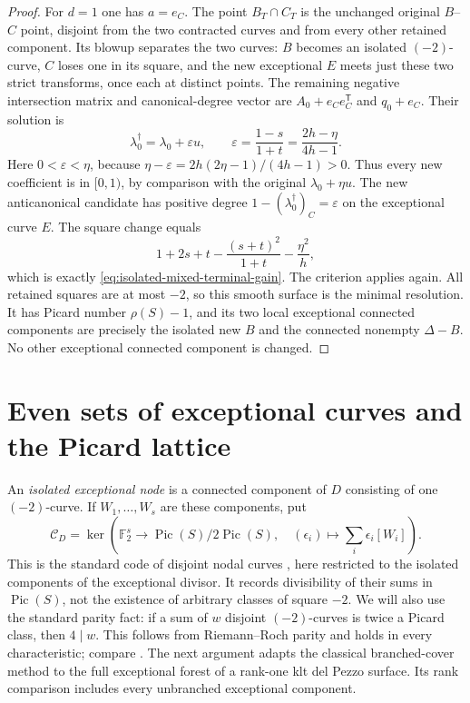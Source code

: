 \documentclass[11pt,reqno]{amsart}
\theoremstyle{definition}
\theoremstyle{remark}
\DeclareMathOperator{\Pic}{Pic}
\numberwithin{equation}{section}
\begin{document}
\begin{proof}
For $d=1$ one has $a=e_C$. The point $B_T\cap C_T$ is the unchanged
original $B$--$C$ point, disjoint from the two contracted curves and
from every other retained component. Its blowup separates the two
curves: $B$ becomes an isolated $(-2)$-curve, $C$ loses one in its
square, and the new exceptional $E$ meets just these two strict
transforms, once each at distinct points.
The remaining negative intersection matrix and canonical-degree vector are $A_0+e_Ce_C^{\mathsf T}$ and
$q_0+e_C$. Their solution is
\begin{equation}\label{eq:isolated-mixed-new-discrepancy}
 \lambda_0^\dagger=\lambda_0+\varepsilon u,\qquad
 \varepsilon=\frac{1-s}{1+t}=\frac{2h-\eta}{4h-1}.
\end{equation}
Here $0<\varepsilon<\eta$, because
$\eta-\varepsilon=2h(2\eta-1)/(4h-1)>0$.
Thus every new coefficient is in $[0,1)$, by comparison with the
original $\lambda_0+\eta u$.
The new anticanonical candidate has positive degree
$1-(\lambda_0^\dagger)_C=\varepsilon$ on the exceptional curve $E$.
The square change equals
\[
 1+2s+t-\frac{(s+t)^2}{1+t}-\frac{\eta^2}{h},
\]
which is exactly \eqref{eq:isolated-mixed-terminal-gain}.
The criterion applies again. All retained squares are at most $-2$,
so this smooth surface is the minimal resolution. It has Picard
number $\rho(S)-1$, and its two local exceptional connected components are precisely the
isolated new $B$ and the connected nonempty $\Delta-B$.
No other exceptional connected component is changed.
\end{proof}


\section{Even sets of exceptional curves and the Picard lattice}
\label{sec:nodes}
An \emph{isolated exceptional node} is a connected component of $D$ consisting of
one $(-2)$-curve. If $W_1,\ldots,W_s$ are these components, put
\[
 \mathcal C_D=\ker\left(\mathbb F_2^s\longrightarrow
 \Pic(S)/2\Pic(S),\quad (\epsilon_i)\longmapsto
 \sum_i\epsilon_i[W_i]\right).
\]
This is the standard code of disjoint nodal curves
\cite[Section~2]{DolgachevMendesLopesPardini}, here restricted to the
isolated components of the exceptional divisor. It records divisibility
of their sums in $\Pic(S)$, not the existence of arbitrary classes of
square $-2$. We will also use the standard parity fact: if a sum of
$w$ disjoint $(-2)$-curves is twice a Picard class, then $4\mid w$.
This follows from Riemann--Roch parity and holds in every
characteristic; compare \cite[Section~2]{DolgachevMendesLopesPardini}.
The next argument adapts the classical branched-cover method to the
full exceptional forest of a rank-one klt del Pezzo surface. Its rank
comparison includes every unbranched exceptional component.
\end{document}

